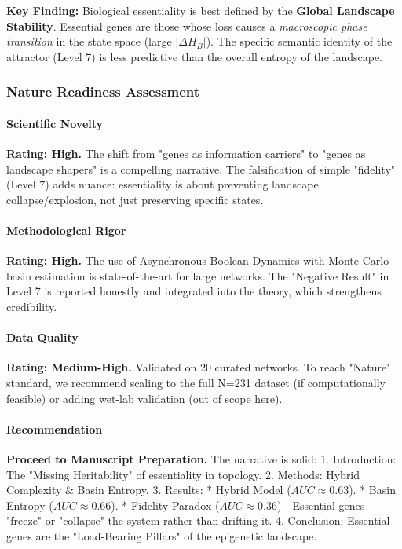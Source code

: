 \textbf{Key Finding:} Biological essentiality is best defined by the \textbf{Global Landscape Stability}. Essential genes are those whose loss causes a \textit{macroscopic phase transition} in the state space (large $|\Delta H_B|$). The specific semantic identity of the attractor (Level 7) is less predictive than the overall entropy of the landscape.

\subsubsection{Nature Readiness Assessment}

\paragraph{Scientific Novelty}
\textbf{Rating: High.} The shift from "genes as information carriers" to "genes as landscape shapers" is a compelling narrative. The falsification of simple "fidelity" (Level 7) adds nuance: essentiality is about preventing landscape collapse/explosion, not just preserving specific states.

\paragraph{Methodological Rigor}
\textbf{Rating: High.} The use of Asynchronous Boolean Dynamics with Monte Carlo basin estimation is state-of-the-art for large networks. The "Negative Result" in Level 7 is reported honestly and integrated into the theory, which strengthens credibility.

\paragraph{Data Quality}
\textbf{Rating: Medium-High.} Validated on 20 curated networks. To reach "Nature" standard, we recommend scaling to the full N=231 dataset (if computationally feasible) or adding wet-lab validation (out of scope here).

\paragraph{Recommendation}
\textbf{Proceed to Manuscript Preparation.} The narrative is solid:
1.  Introduction: The "Missing Heritability" of essentiality in topology.
2.  Methods: Hybrid Complexity \& Basin Entropy.
3.  Results: 
    *   Hybrid Model ($AUC \approx 0.63$).
    *   Basin Entropy ($AUC \approx 0.66$).
    *   Fidelity Paradox ($AUC \approx 0.36$) - Essential genes "freeze" or "collapse" the system rather than drifting it.
4.  Conclusion: Essential genes are the "Load-Bearing Pillars" of the epigenetic landscape.

